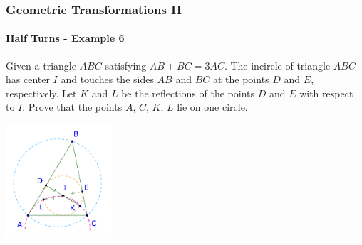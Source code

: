 \documentclass[8pt,xcolor=table,dvipsnames]{beamer}
\begin{document}
\begin{frame}[t]
    \frametitle{Geometric Transformations II}
    \framesubtitle{Half Turns - Example 6}
    \begin{example}
        Given a triangle $ABC$ satisfying $AB+BC=3 AC$.
        The incircle of triangle $ABC$ has center $I$ and touches the sides $AB$ and $BC$ at the points $D$ and $E$, respectively.
        Let $K$ and $L$ be the reflections of the points $D$ and $E$ with respect to $I$.
        \bigbreak
        Prove that the points $A$, $C$, $K$, $L$ lie on one circle.
    \end{example}

    \begin{center}
        \includegraphics[width=4cm]{./svg/pdf/imo-sl-2005-g1.pdf}
    \end{center}
\end{frame}
\end{document}
